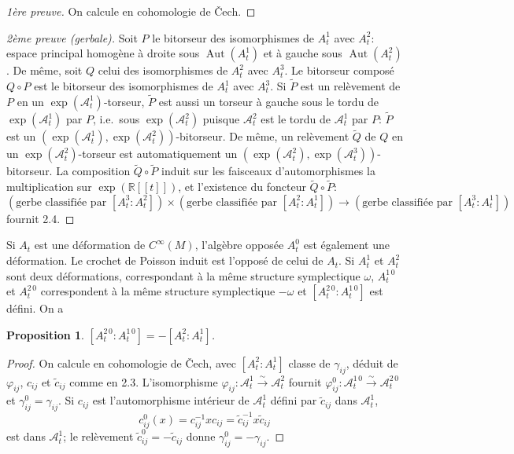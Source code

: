 \documentclass[11pt,a4paper]{article}
\theoremstyle{plain}
\newtheorem{proposition}[theorem]{Proposition}
\theoremstyle{definition}
\DeclareMathOperator{\Aut}{Aut}
\newcommand{\R}{\mathbb{R}}
\newcommand{\iso}{\xrightarrow{\sim}}
\begin{document}
\begin{proof}[1\`ere preuve]
On calcule en cohomologie de \v{C}ech.
\end{proof}

\begin{proof}[2\`eme preuve (gerbale)]
Soit $P$ le bitorseur des isomorphismes de $A_{t}^{1}$ avec $A_{t}^{2}$:
espace principal homog\`ene \`a droite sous $\Aut(A_{t}^{1})$ et \`a gauche sous $\Aut(A_{t}^{2})$. De
m\^eme, soit $Q$ celui des isomorphismes de $A_{t}^{2}$ avec $A_{t}^{3}$. Le bitorseur compos\'e $Q \circ P$
est le bitorseur des isomorphismes de $A_{t}^{1}$ avec $A_{t}^{3}$. Si $\tilde{P}$ est un rel\`evement de $P$ en
un $\exp(\mathcal{A}_{t}^{1})$-torseur, $\tilde{P}$ est aussi un torseur \`a gauche sous le tordu de $\exp(\mathcal{A}_{t}^{1})$ par $P$,
i.e.\ sous $\exp(\mathcal{A}_{t}^{2})$ puisque $\mathcal{A}_{t}^{2}$ est le tordu de $\mathcal{A}_{t}^{1}$ par $P$: $\tilde{P}$ est un $(\exp(\mathcal{A}_{t}^{1}), \exp(\mathcal{A}_{t}^{2}))$-bitorseur. De m\^eme, un rel\`evement $\tilde{Q}$ de $Q$ en un $\exp(\mathcal{A}_{t}^{2})$-torseur est automatiquement
un $(\exp(\mathcal{A}_{t}^{2}), \exp(\mathcal{A}_{t}^{3}))$-bitorseur. La composition $\tilde{Q} \circ \tilde{P}$ induit sur les faisceaux
d'automorphismes la multiplication sur $\exp(\R[[t]])$, et l'existence du foncteur $\tilde{Q} \circ \tilde{P}$:
\[
(\text{gerbe classifi\'ee par } [A_{t}^{3} : A_{t}^{2}]) \times (\text{gerbe classifi\'ee par } [A_{t}^{2} : A_{t}^{1}]) \longrightarrow (\text{gerbe classifi\'ee par } [A_{t}^{3} : A_{t}^{1}])
\]
fournit 2.4.
\end{proof}

Si $A_{t}$ est une d\'eformation de $C^{\infty}(M)$, l'alg\`ebre oppos\'ee $A_{t}^{0}$ est \'egalement une d\'eformation. Le crochet de Poisson induit est l'oppos\'e de celui de $A_{t}$. Si $A_{t}^{1}$ et $A_{t}^{2}$
sont deux d\'eformations, correspondant \`a la m\^eme structure symplectique $\omega$, $A_{t}^{1\,0}$ et
$A_{t}^{2\,0}$ correspondent \`a la m\^eme structure symplectique $-\omega$ et $[A_{t}^{2\,0} : A_{t}^{1\,0}]$ est d\'efini.
On a

\begin{proposition}
$[A_{t}^{2\,0} : A_{t}^{1\,0}] = -[A_{t}^{2} : A_{t}^{1}]$.
\end{proposition}

\begin{proof}
On calcule en cohomologie de \v{C}ech, avec $[A_{t}^{2} : A_{t}^{1}]$ classe de $\gamma_{ij}$, d\'eduit de
$\varphi_{ij}$, $c_{ij}$ et $\tilde{c}_{ij}$ comme en 2.3. L'isomorphisme $\varphi_{ij}: \mathcal{A}_{t}^{1} \iso \mathcal{A}_{t}^{2}$ fournit $\varphi_{ij}^{0}: \mathcal{A}_{t}^{1\,0} \iso \mathcal{A}_{t}^{2\,0}$ et $\gamma_{ij}^{0} = \gamma_{ij}$. Si $c_{ij}$ est l'automorphisme int\'erieur de $\mathcal{A}_{t}^{1}$ d\'efini par $\tilde{c}_{ij}$ dans $\mathcal{A}_{t}^{1}$,
\[
c_{ij}^{0}(x) = c_{ij}^{-1} x c_{ij} = \tilde{c}_{ij}^{-1} x \tilde{c}_{ij}
\]
est dans $\mathcal{A}_{t}^{1}$; le rel\`evement $\tilde{c}_{ij}^{0} = -\tilde{c}_{ij}$ donne $\gamma_{ij}^{0} = -\gamma_{ij}$.
\end{proof}
\end{document}
